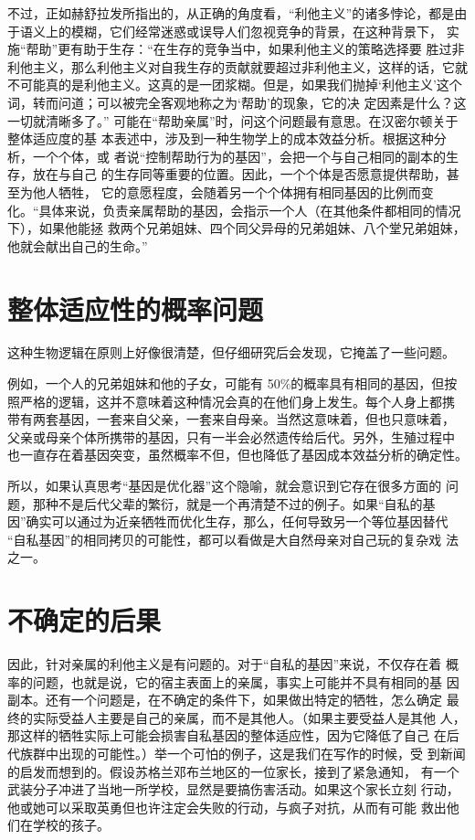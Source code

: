 不过，正如赫舒拉发所指出的，从正确的角度看，“利他主义”的诸多悖论，都是由于语义上的模糊，它们经常迷惑或误导人们忽视竞争的背景，在这种背景下， 实施“帮助”更有助于生存：“在生存的竞争当中，如果利他主义的策略选择要 胜过非利他主义，那么利他主义对自我生存的贡献就要超过非利他主义，这样的话，它就不可能真的是利他主义。这真的是一团浆糊。但是，如果我们抛掉‘利他主义’这个词，转而问道；可以被完全客观地称之为‘帮助’的现象，它的决 定因素是什么？这一切就清晰多了。”  可能在“帮助亲属”时，问这个问题最有意思。在汉密尔顿关于整体适应度的基 本表述中，涉及到一种生物学上的成本效益分析。根据这种分析，一个个体，或 者说“控制帮助行为的基因”，会把一个与自己相同的副本的生存，放在与自己 的生存同等重要的位置。因此，一个个体是否愿意提供帮助，甚至为他人牺牲， 它的意愿程度，会随着另一个个体拥有相同基因的比例而变化。“具体来说，负责亲属帮助的基因，会指示一个人（在其他条件都相同的情况下），如果他能拯 救两个兄弟姐妹、四个同父异母的兄弟姐妹、八个堂兄弟姐妹，他就会献出自己的生命。” 

\section{整体适应性的概率问题}

这种生物逻辑在原则上好像很清楚，但仔细研究后会发现，它掩盖了一些问题。

例如，一个人的兄弟姐妹和他的子女，可能有 50\%的概率具有相同的基因，但按 照严格的逻辑，这并不意味着这种情况会真的在他们身上发生。每个人身上都携 带有两套基因，一套来自父亲，一套来自母亲。当然这意味着，但也只意味着， 父亲或母亲个体所携带的基因，只有一半会必然遗传给后代。另外，生殖过程中 也一直存在着基因突变，虽然概率不但，但也降低了基因成本效益分析的确定性。

所以，如果认真思考“基因是优化器”这个隐喻，就会意识到它存在很多方面的 问题，那种不是后代父辈的繁衍，就是一个再清楚不过的例子。如果“自私的基 因”确实可以通过为近亲牺牲而优化生存，那么，任何导致另一个等位基因替代 “自私基因”的相同拷贝的可能性，都可以看做是大自然母亲对自己玩的复杂戏 法之一。

\section{不确定的后果}
因此，针对亲属的利他主义是有问题的。对于“自私的基因”来说，不仅存在着 概率的问题，也就是说，它的宿主表面上的亲属，事实上可能并不具有相同的基 因副本。还有一个问题是，在不确定的条件下，如果做出特定的牺牲，怎么确定 最终的实际受益人主要是自己的亲属，而不是其他人。（如果主要受益人是其他 人，那这样的牺牲实际上可能会损害自私基因的整体适应性，因为它降低了自己 在后代族群中出现的可能性。）举一个可怕的例子，这是我们在写作的时候，受 到新闻的启发而想到的。假设苏格兰邓布兰地区的一位家长，接到了紧急通知， 有一个武装分子冲进了当地一所学校，显然是要搞伤害活动。如果这个家长立刻 行动，他或她可以采取英勇但也许注定会失败的行动，与疯子对抗，从而有可能 救出他们在学校的孩子。

